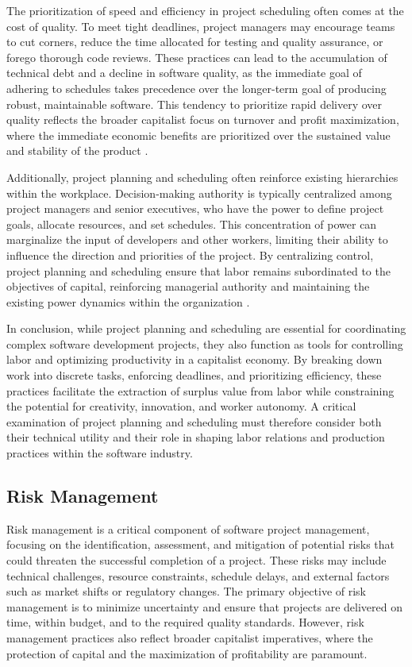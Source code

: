 \begin{refsection}
The prioritization of speed and efficiency in project scheduling often comes at the cost of quality. To meet tight deadlines, project managers may encourage teams to cut corners, reduce the time allocated for testing and quality assurance, or forego thorough code reviews. These practices can lead to the accumulation of technical debt and a decline in software quality, as the immediate goal of adhering to schedules takes precedence over the longer-term goal of producing robust, maintainable software. This tendency to prioritize rapid delivery over quality reflects the broader capitalist focus on turnover and profit maximization, where the immediate economic benefits are prioritized over the sustained value and stability of the product \cite[pp.~92-95]{Humphrey1989ManagingSoftwareProcess}.

Additionally, project planning and scheduling often reinforce existing hierarchies within the workplace. Decision-making authority is typically centralized among project managers and senior executives, who have the power to define project goals, allocate resources, and set schedules. This concentration of power can marginalize the input of developers and other workers, limiting their ability to influence the direction and priorities of the project. By centralizing control, project planning and scheduling ensure that labor remains subordinated to the objectives of capital, reinforcing managerial authority and maintaining the existing power dynamics within the organization \cite[pp.~115-118]{Taylor2009ScientificManagement}.

In conclusion, while project planning and scheduling are essential for coordinating complex software development projects, they also function as tools for controlling labor and optimizing productivity in a capitalist economy. By breaking down work into discrete tasks, enforcing deadlines, and prioritizing efficiency, these practices facilitate the extraction of surplus value from labor while constraining the potential for creativity, innovation, and worker autonomy. A critical examination of project planning and scheduling must therefore consider both their technical utility and their role in shaping labor relations and production practices within the software industry.

\subsection{Risk Management}

Risk management is a critical component of software project management, focusing on the identification, assessment, and mitigation of potential risks that could threaten the successful completion of a project. These risks may include technical challenges, resource constraints, schedule delays, and external factors such as market shifts or regulatory changes. The primary objective of risk management is to minimize uncertainty and ensure that projects are delivered on time, within budget, and to the required quality standards. However, risk management practices also reflect broader capitalist imperatives, where the protection of capital and the maximization of profitability are paramount.


\end{refsection}
